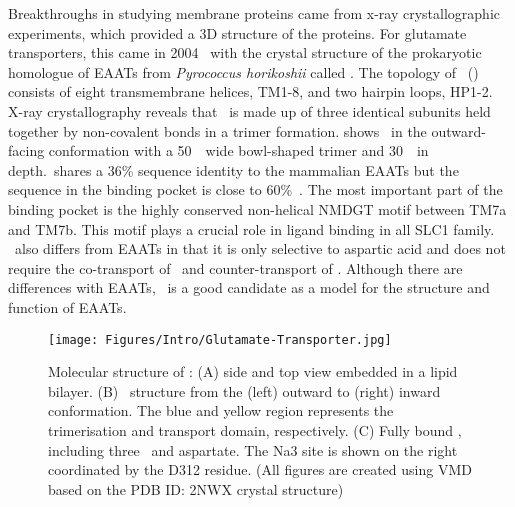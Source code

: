 Breakthroughs in studying membrane proteins came from x-ray crystallographic experiments, 
which provided a 3D structure of the proteins. For glutamate transporters, this came in 
2004~\cite{Yernool2004} with the crystal structure of the prokaryotic homologue of EAATs from 
\textit{Pyrococcus horikoshii} called \GltPh. The topology of \GltPh\ () 
consists of eight transmembrane helices, TM1-8, and two hairpin loops, HP1-2. X-ray crystallography 
reveals that \GltPh\ is made up of three identical subunits held together by non-covalent bonds 
in a trimer formation.  shows \GltPh\ in the outward-facing conformation 
with a 50~\angs\ wide bowl-shaped  trimer and 30~\angs\ in depth.\GltPh\ shares a 36\% sequence 
identity to the mammalian EAATs but the sequence in the binding pocket is close to 
60\%~\cite{Kavanaugh1997}. The most important part of the binding pocket is the highly conserved 
non-helical NMDGT motif between TM7a and TM7b. This motif plays a crucial role in ligand binding 
in all SLC1 family. \GltPh\ also differs from EAATs in that it is only selective to aspartic acid 
and does not require the co-transport of \Hi\ and counter-transport of \K. Although there are 
differences with EAATs, \GltPh\ is a good candidate as a model for the structure and function of 
EAATs. 

\begin{figure}[t!]
\centering
\texttt{[image: Figures/Intro/Glutamate-Transporter.jpg]}
\caption{Molecular structure of \GltPh: (A) side and top view embedded in a lipid bilayer. (B) 
\GltPh\ structure from the (left) outward to (right) inward conformation. The blue and yellow 
region represents the trimerisation and transport domain, respectively. (C) Fully bound \GltPh, 
including three \Na\ and aspartate. The Na3 site is shown on the right coordinated by the D312 
residue. (All figures are created using VMD based on the PDB ID: 2NWX crystal structure)}
\label{intro:gltph}
\end{figure}

